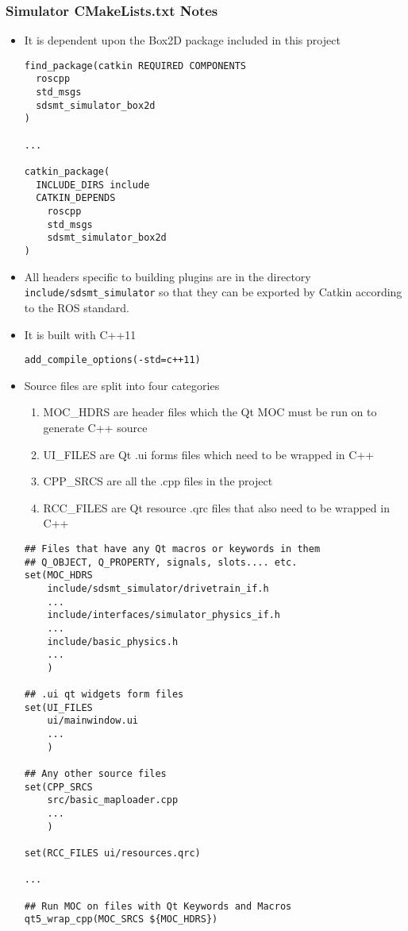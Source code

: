 \subsubsection*{Simulator CMakeLists.txt Notes}
\begin{itemize}
	\item It is dependent upon the Box2D package included in this project
	\begin{lstlisting}
find_package(catkin REQUIRED COMPONENTS
  roscpp
  std_msgs
  sdsmt_simulator_box2d
)

...

catkin_package(
  INCLUDE_DIRS include
  CATKIN_DEPENDS
    roscpp
    std_msgs
    sdsmt_simulator_box2d
)
	\end{lstlisting}
	\item All headers specific to building plugins are in the directory \lstinline|include/sdsmt_simulator| so that they can be exported by Catkin according to the ROS standard.
	\item It is built with C++11
	\begin{lstlisting}
add_compile_options(-std=c++11)
	\end{lstlisting}
	\item Source files are split into four categories
	\begin{enumerate}
		\item MOC\_HDRS are header files which the Qt MOC must be run on to generate C++ source
		\item UI\_FILES are Qt .ui forms files which need to be wrapped in C++
		\item CPP\_SRCS are all the .cpp files in the project
		\item RCC\_FILES are Qt resource .qrc files that also need to be wrapped in C++
	\end{enumerate}
	\begin{lstlisting}
## Files that have any Qt macros or keywords in them
## Q_OBJECT, Q_PROPERTY, signals, slots.... etc.
set(MOC_HDRS
    include/sdsmt_simulator/drivetrain_if.h
    ...
    include/interfaces/simulator_physics_if.h
    ...
    include/basic_physics.h
    ...
    )

## .ui qt widgets form files
set(UI_FILES
    ui/mainwindow.ui
    ...
    )

## Any other source files
set(CPP_SRCS
    src/basic_maploader.cpp
    ...
    )

set(RCC_FILES ui/resources.qrc)

...

## Run MOC on files with Qt Keywords and Macros
qt5_wrap_cpp(MOC_SRCS ${MOC_HDRS})


\end{lstlisting}
\end{itemize}
